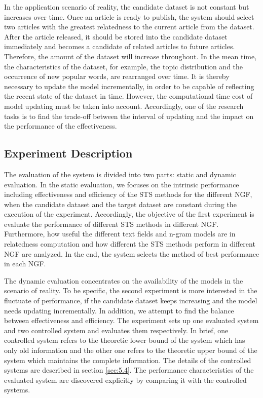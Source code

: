 In the application scenario of reality, the candidate dataset is not constant but increases over time. Once an article is ready to publish, the system should select two articles with the greatest relatedness to the current article from the dataset. After the article released, it should be stored into the candidate dataset immediately and becomes a candidate of related articles to future articles. Therefore, the amount of the dataset will increase throughout. In the mean time, the characteristics of the dataset, for example, the topic distribution and the occurrence of new popular words, are rearranged over time. It is thereby necessary to update the model incrementally, in order to be capable of reflecting the recent state of the dataset in time. However, the computational time cost of model updating must be taken into account. Accordingly, one of the research tasks is to find the trade-off between the interval of updating and the impact on the performance of the effectiveness.  

\subsection{Experiment Description}
\label{sec:4.4}

The evaluation of the system is divided into two parts: static and dynamic evaluation. In the static evaluation, we focuses on the intrinsic performance including effectiveness and efficiency of the STS methods for the different NGF, when the candidate dataset and the target dataset are constant during the execution of the experiment. Accordingly, the objective of the first experiment is evaluate the performance of different STS methods in different NGF. Furthermore, how useful the different text fields and n-gram models are in relatedness computation and how different the STS methods perform in different NGF are analyzed. In the end, the system selects the method of best performance in each NGF. 

The dynamic evaluation concentrates on the availability of the models in the scenario of reality. To be specific, the second experiment is more interested in the fluctuate of performance, if the candidate dataset keeps increasing and the model needs updating incrementally. In addition, we attempt to find the balance between effectiveness and efficiency. The experiment sets up one evaluated system and two controlled system and evaluates them respectively. In brief, one controlled system refers to the theoretic lower bound of the system which has only old information and the other one refers to the theoretic upper bound of the system which maintains the complete information. The details of the controlled systems are described in section \ref{sec:5.4}. The performance characteristics of the evaluated system are discovered explicitly by comparing it with the controlled systems. 

